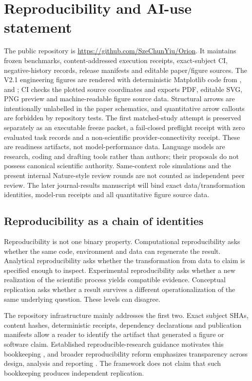 \section*{Reproducibility and AI-use statement}
The public repository is \url{https://github.com/SzeChunYiu/Orion}. It maintains frozen benchmarks, content-addressed execution receipts, exact-subject CI, negative-history records, release manifests and editable paper/figure sources. The V2.1 engineering figures are rendered with deterministic Matplotlib code from ,  and ; CI checks the plotted source coordinates and exports PDF, editable SVG, PNG preview and machine-readable figure source data. Structural arrows are intentionally unlabelled in the paper schematics, and quantitative arrow callouts are forbidden by repository tests. The first matched-study attempt is preserved separately as an executable freeze packet, a fail-closed preflight receipt with zero evaluated task records and a non-scientific provider-connectivity receipt. These are readiness artifacts, not model-performance data. Language models are research, coding and drafting tools rather than authors; their proposals do not possess canonical scientific authority. Same-context role simulations and the present internal Nature-style review rounds are not counted as independent peer review. The later journal-results manuscript will bind exact data/transformation identities, model-run receipts and all quantitative figure source data.

\appendix
\subsection{Reproducibility as a chain of identities}

Reproducibility is not one binary property. Computational reproducibility asks whether the same code, environment and data can regenerate the result. Analytical reproducibility asks whether the transformation from data to claim is specified enough to inspect. Experimental reproducibility asks whether a new realization of the scientific process yields compatible evidence. Conceptual replication asks whether a result survives a different operationalization of the same underlying question. These levels can disagree.

The repository infrastructure mainly addresses the first two. Exact subject SHAs, content hashes, deterministic receipts, dependency declarations and publication manifests allow a reader to identify the artifact that generated a figure or software claim. Established reproducible-research guidance motivates this bookkeeping \cite{sandve2013,wilson2017}, and broader reproducibility reform emphasizes transparency across design, analysis and reporting \cite{munafo2017}. The framework does not claim that such bookkeeping produces independent replication.

